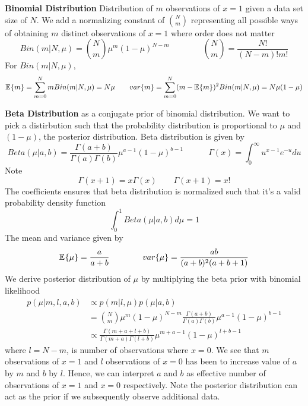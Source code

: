 \documentclass[11pt]{article}
\begin{document}
\begin{defn*}
    \textbf{Binomial Distribution} Distribution of $m$ observations of $x=1$ given a data set size of $N$. We add a normalizing constant of $\binom{N}{m}$ representing all possible ways of obtaining $m$ distinct observations of $x=1$ where order does not matter
    \[
        Bin(m|N,\mu) = \binom{N}{m} \mu^m (1-\mu)^{N-m}
        \quad \quad \quad \quad 
        \binom{N}{m} = \frac{N!}{(N-m)!m!}
    \]
    For $Bin(m|N,\mu)$,
    \[
        \mathbb{E}_{}\{m\} = \sum_{m=0}^N m Bin(m|N,\mu)= N\mu
        \quad \quad 
        var\{m\} = \sum_{m=0}^N (m-\mathbb{E}_{}\{m\})^2 Bin(m|N,\mu) = N\mu(1-\mu)
    \]
\end{defn*}

\begin{defn*}
    \textbf{Beta Distribution} as a conjugate prior of binomial distribution. We want to pick a distirbution such that the probability distribution is proportional to $\mu$ and $(1-\mu)$, the posterior distribution. Beta distribution is given by 
    \[
        Beta(\mu | a,b) = \frac{\Gamma(a+b)}{\Gamma(a)\Gamma(b)} \mu^{a-1}(1-\mu)^{b-1}
        \quad \quad \quad 
        \Gamma(x) = \int_0^{\infty} u^{x-1} e^{-u} du
    \]
    Note 
    \[
        \Gamma(x+1)=x\Gamma(x) \quad \quad \Gamma(x+1) = x!    
    \]
    The coefficients ensures that beta distribution is normalized such that it's a valid probability density function
    \[
        \int^1_0 Beta(\mu |a,b) d\mu = 1    
    \]
    The mean and variance given by 
    \[
        \mathbb{E}_{}\{\mu\} = \frac{a}{a+b}
        \quad \quad \quad \quad 
        var\{\mu\} = \frac{ab}{(a+b)^2(a+b+1)}
    \]
    We derive posterior distribution of $\mu$ by multiplying the beta prior with binomial likelihood 
    \begin{align*}
        p(\mu | m,l,a,b) 
        &\propto p(m|l,\mu)p(\mu|a,b) \\ 
        &=
        \binom{N}{m} \mu^m (1-\mu)^{N-m} \frac{\Gamma(a+b)}{\Gamma(a)\Gamma(b)} \mu^{a-1}(1-\mu)^{b-1} \\
        &\propto \frac{\Gamma(m+a+l+b)}{\Gamma(m+a)\Gamma(l+b)} \mu^{m+a-1} (1-\mu)^{l+b-1}
    \end{align*}
    where $l=N-m$, is number of observations where $x=0$. We see that $m$ observations of $x=1$ and $l$ observations of $x=0$ has been to increase value of $a$ by $m$ and $b$ by $l$. Hence, we can interpret $a$ and $b$ as effective number of observations of $x=1$ and $x=0$ respectively. Note the posterior distribution can act as the prior if we subsequently observe additional data.  \\

\end{defn*}
\end{document}
